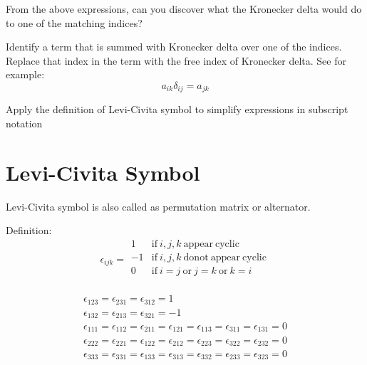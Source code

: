 \begin{question}[ID=kdelteuse1]
From the above expressions, can you discover what the Kronecker delta would do to one of the matching indices?
\end{question}
\begin{solution}[print]
Identify a term that is summed with Kronecker delta over one of the indices. Replace that index in the term with the free index of Kronecker delta. See for example:
$$ a_{ik} \delta_{ij} = a_{jk}$$
\end{solution}

\begin{lo3}[Preliminaries]
Apply the definition of Levi-Civita symbol to simplify expressions in subscript notation
\end{lo3}


\section{Levi-Civita Symbol}

Levi-Civita symbol is also called as permutation matrix or alternator.  

Definition: 
$$ \epsilon_{ijk} = 
\begin{array}{ll}
1 & \mathrm{if}\  i,j,k \  \mathrm{appear \  cyclic} \\
-1 & \mathrm{if}\  i,j,k \  \mathrm{donot \ appear\ cyclic} \\
0 & \mathrm{if}\ i=j \  \mathrm{or} \  j=k \ \mathrm{or} \  k=i  \\
\end{array} $$

$$ 
\begin{array}{l}
\epsilon_{123} = \epsilon_{231} = \epsilon_{312} = 1 \\
\epsilon_{132} = \epsilon_{213} = \epsilon_{321} = -1 \\
\epsilon_{111} = \epsilon_{112} = \epsilon_{211} =\epsilon_{121} = \epsilon_{113} = \epsilon_{311} =\epsilon_{131} = 0 \\
\epsilon_{222} = \epsilon_{221} = \epsilon_{122} =\epsilon_{212} = \epsilon_{223} = \epsilon_{322} =\epsilon_{232} = 0 \\
\epsilon_{333} = \epsilon_{331} = \epsilon_{133} =\epsilon_{313} = \epsilon_{332} = \epsilon_{233} = \epsilon_{323} = 0 \\
\end{array}
$$

